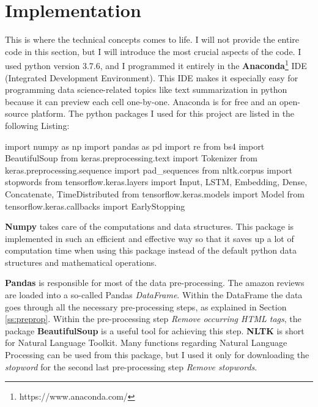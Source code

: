 \newpage

\section{Implementation}\label{ss:imp}

This is where the technical concepts comes to life. I will not provide the entire code in this section, but I will introduce the most crucial aspects of the code. I used python version 3.7.6, and I programmed it entirely in the \textbf{Anaconda}\footnote{https://www.anaconda.com/} IDE (Integrated Development Environment). This IDE makes it especially easy for programming data science-related topics like text summarization in python because it can preview each cell one-by-one. Anaconda is for free and an open-source platform. The python packages I used for this project are listed in the following Listing:

\begin{python}
	import numpy as np  
	import pandas as pd 
	import re           
	from bs4 import BeautifulSoup 
	from keras.preprocessing.text import Tokenizer 
	from keras.preprocessing.sequence import pad_sequences
	from nltk.corpus import stopwords   
	from tensorflow.keras.layers import Input, LSTM, Embedding, Dense, Concatenate, TimeDistributed
	from tensorflow.keras.models import Model
	from tensorflow.keras.callbacks import EarlyStopping
\end{python}

\textbf{Numpy} takes care of the computations and data structures. This package is implemented in such an efficient and effective way so that it saves up a lot of computation time when using this package instead of the default python data structures and mathematical operations.

\textbf{Pandas} is responsible for most of the data pre-processing. The amazon reviews are loaded into a so-called Pandas \textit{DataFrame}. Within the DataFrame the data goes through all the necessary pre-processing steps, as explained in Section \ref{ss:preprop}. Within the pre-processing step \textit{Remove occurring HTML tags}, the package \textbf{BeautifulSoup} is a useful tool for achieving this step. \textbf{NLTK} is short for Natural Language Toolkit. Many functions regarding Natural Language Processing can be used from this package, but I used it only for downloading the \textit{stopword} for the second last pre-processing step \textit{Remove stopwords}.

